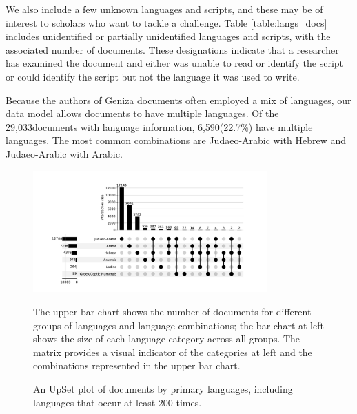 \documentclass{article}
\def\documentsAnyLang{29,033}
\def\documentsMultiLang{6,590}
\def\percentDocsMultiLang{22.7\%}
\begin{document}
We also include a few unknown languages and scripts, and these may be of interest to scholars who want to tackle a challenge. Table \ref{table:langs_docs} includes unidentified or partially unidentified languages and scripts, with the associated number of documents. These designations indicate that a researcher has examined the document and either was unable to read or identify the script or could identify the script but not the language it was used to write.

Because the authors of Geniza documents often employed a mix of languages, our data model allows documents to have multiple languages. Of the \documentsAnyLang documents with language information, \documentsMultiLang (\percentDocsMultiLang) have multiple languages. The most common combinations are Judaeo-Arabic with Hebrew and Judaeo-Arabic with Arabic. 

\begin{figure}[!hbt]
  \centering
  \includegraphics[width=0.8\textwidth]{charts/primary_language_upsetplot.pdf}
  \caption{An UpSet plot of documents by primary languages, including languages that occur at least 200 times.}
    \medskip
    \small
    The upper bar chart shows the number of documents for different groups of languages and language combinations; the bar chart at left shows the size of each language category across all groups. The matrix provides a visual indicator of the categories at left and the combinations represented in the upper bar chart.\footnotemark
  \label{fig:lang_combination_upset_plot}
\end{figure}

\end{document}
